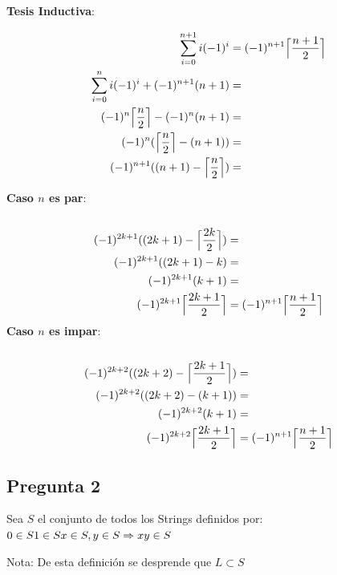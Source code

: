 \documentclass[12pt]{article}
\DeclarePairedDelimiter{\ceil}{\lceil}{\rceil}
\begin{document}
\newpage
\textbf{Tesis Inductiva}:

\begin{align}
\sum_{i=0}^{n + 1} i(-1)^i&=(-1)^{n+1} \ceil[\Big]{\frac{n+1}{2}}\\
\sum_{i=0}^{n} i(-1)^i + (-1)^{n+1}(n+1)&=\\
(-1)^{n} \ceil[\Big]{\frac{n}{2}}-(-1)^{n}(n+1)&=\\
(-1)^{n}(\ceil[\Big]{\frac{n}{2}}-(n+1))&=\\
(-1)^{n+1}((n+1)-\ceil[\Big]{\frac{n}{2}})&=
\end{align}

\textbf{Caso $n$ es par}:\\
\\
\begin{align}
(-1)^{2k+1}((2k+1)-\ceil[\Big]{\frac{2k}{2}})&=\\
(-1)^{2k+1}((2k+1)-k)&=\\
(-1)^{2k+1}(k+1)&=\\
(-1)^{2k+1}\ceil[\Big]{\frac{2k +1}{2}}&=(-1)^{n+1}\ceil[\Big]{\frac{n +1}{2}}\\
\end{align}
\textbf{Caso $n$ es impar}:\\
\\
\begin{align}
(-1)^{2k+2}((2k+2)-\ceil[\Big]{\frac{2k+1}{2}})&=\\
(-1)^{2k+2}((2k+2)-(k + 1))&=\\
(-1)^{2k+2}(k+1)&=\\
(-1)^{2k+2}\ceil[\Big]{\frac{2k +1}{2}}&=(-1)^{n+1}\ceil[\Big]{\frac{n +1}{2}}\\
\end{align}


\newpage
\subsection*{Pregunta 2}

Sea $S$ el conjunto de todos los Strings definidos por:\\
\begin{math}
0 \in S \\
1 \in S \\
x \in S, y \in S \Rightarrow x y \in S
\end{math}

Nota: De esta definición se desprende que $L \subset S$ \\
\end{document}
